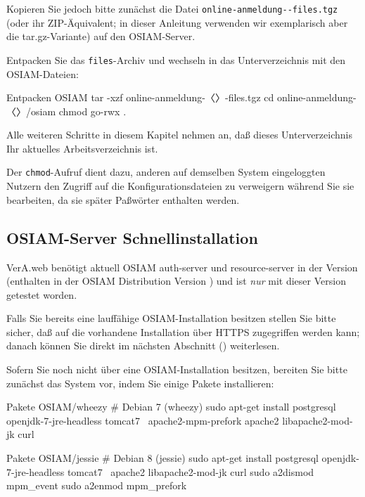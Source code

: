 Kopieren Sie jedoch bitte zunächst die Datei
\texttt{online-anmeldung-\vwiaverssw{}-files.tgz} (oder ihr
ZIP-Äquivalent; in dieser Anleitung verwenden wir exemplarisch
aber die tar.gz-Variante) auf den OSIAM-Server.

\begin{minipage}{\textwidth}
Entpacken Sie das \texttt{files}-Archiv und wechseln in das
Unterverzeichnis mit den OSIAM-Dateien:

\begin{lstdump}{Entpacken OSIAM}
tar -xzf online-anmeldung-〈\lstdumpesc{\vwiaverssw}〉-files.tgz
cd online-anmeldung-〈\lstdumpesc{\vwiaverssw}〉/osiam
chmod go-rwx .
\end{lstdump}
\end{minipage}

Alle weiteren Schritte in diesem Kapitel nehmen an, daß dieses
Unterverzeichnis Ihr aktuelles Arbeitsverzeichnis ist.

Der \texttt{chmod}-Aufruf dient dazu, anderen auf demselben System
eingeloggten Nutzern den Zugriff auf die Konfigurationsdateien zu
verweigern während Sie sie bearbeiten, da sie später Paßwörter
enthalten werden.

\subsection{OSIAM-Server Schnellinstallation}\label{subsec:setup-osiam-fast}

VerA.web benötigt aktuell OSIAM auth-server und resource-server in
der Version \vwiaversosiam{} (enthalten in der OSIAM Distribution
Version \vwiaversodist{}) und ist \emph{nur} mit dieser Version
getestet worden.

Falls Sie bereits eine lauffähige OSIAM-Installation besitzen stellen
Sie bitte sicher, daß auf die vorhandene Installation über HTTPS
zugegriffen werden kann; danach können Sie direkt im nächsten Abschnitt
() weiterlesen.

\begin{minipage}{\textwidth}
Sofern Sie noch nicht über eine OSIAM-Installation besitzen, bereiten
Sie bitte zunächst das System vor, indem Sie einige Pakete installieren:

\begin{lstdump}{Pakete OSIAM/wheezy}
# Debian 7 (wheezy)
sudo apt-get install postgresql openjdk-7-jre-headless tomcat7 \
    apache2-mpm-prefork apache2 libapache2-mod-jk curl
\end{lstdump}

\begin{lstdump}{Pakete OSIAM/jessie}
# Debian 8 (jessie)
sudo apt-get install postgresql openjdk-7-jre-headless tomcat7 \
    apache2 libapache2-mod-jk curl
sudo a2dismod mpm_event
sudo a2enmod mpm_prefork
\end{lstdump}
\end{minipage}

